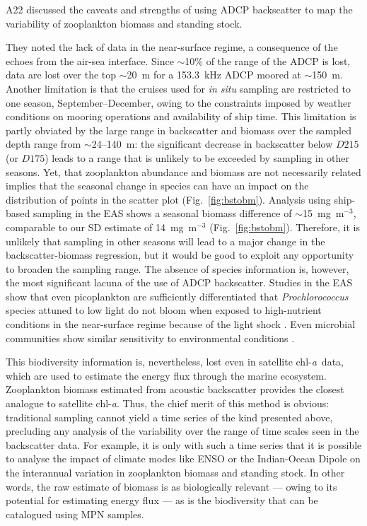 \documentclass[authoryear,review,11pt]{elsarticle}
\newcommand{\chla}{chl-{\emph{a}}}
\begin{document}
A22 discussed the caveats and strengths of using ADCP backscatter to map the variability of zooplankton biomass and standing stock. 

They noted the lack of data in the near-surface regime, a consequence of the echoes from the air-sea interface. Since $\sim$10\% of the range of the ADCP is lost, data are lost over the top $\sim$20~m for a 153.3~kHz ADCP moored at $\sim$150~m. Another limitation is that the cruises used for \emph{in situ} sampling are restricted to one season, September--December, owing to the constraints imposed by weather conditions on mooring operations and availability of ship time. This limitation is partly obviated by the large range in backscatter and biomass over the sampled depth range from $\sim$24--140~m: the significant decrease in backscatter below $D215$ (or $D175$) leads to a range that is unlikely to be exceeded by sampling in other seasons.  Yet, that zooplankton abundance and biomass are not necessarily related \citep[see, for example,][]{madhupratap1990response, israel2018seasonal} implies that the seasonal change in species can have an impact on the distribution of points in the scatter plot (Fig.~\ref{fig:bstobm}). Analysis using ship-based sampling in the EAS \citep{jadhav2024abundance} shows a seasonal biomass difference of $\sim$15~mg~m$^{-3}$, comparable to our SD estimate of 14~mg~m$^{-3}$ (Fig.~\ref{fig:bstobm}). Therefore, it is unlikely that sampling in other seasons will lead to a major change in the backscatter-biomass regression, but it would be good to exploit any opportunity to broaden the sampling range.  The absence of species information is, however, the most significant lacuna of the use of ADCP backscatter.  Studies in the EAS show that even picoplankton are sufficiently differentiated that \emph{Prochlorococcus} species attuned to low light do not bloom when exposed to high-nutrient conditions in the near-surface regime because of the light shock \citep{bemal2018picophytoplankton}. Even microbial communities show similar sensitivity to environmental conditions \citep{khandeparker2025application}.

This biodiversity information is, nevertheless, lost even in satellite \chla\ data, which are used to estimate the energy flux through the marine ecosystem. Zooplankton biomass estimated from acoustic backscatter provides the closest analogue to satellite \chla.  Thus, the chief merit of this method is obvious: traditional sampling cannot yield a time series of the kind presented above, precluding any analysis of the variability over the range of time scales seen in the backscatter data. For example, it is only with such a time series that it is possible to analyse the impact of climate modes like ENSO \citep[El~Ni{\~n}o Southern Oscillation; see, for example,][]{sikka:1980} or the Indian-Ocean Dipole \citep[IOD;][]{saji/etal:1999} on the interannual variation in zooplankton biomass and standing stock. In other words, the raw estimate of biomass is as biologically relevant --- owing to its potential for estimating energy flux --- as is the biodiversity that can be catalogued using MPN samples.
\end{document}
